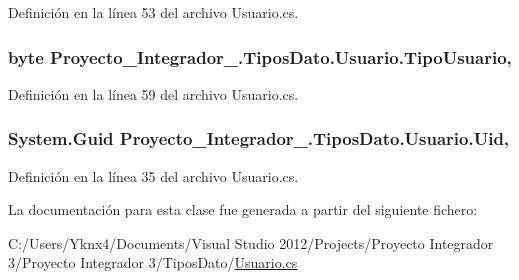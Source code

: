 Definición en la línea 53 del archivo Usuario.\-cs.

\hypertarget{class_proyecto___integrador__3_1_1_tipos_dato_1_1_usuario_a56f1e08f344ba5851703edab28232278}{
\subsubsection[{Tipo\-Usuario}]{\setlength{\rightskip}{0pt plus 5cm}byte Proyecto\-\_\-\-Integrador\-\_.\-Tipos\-Dato.\-Usuario.\-Tipo\-Usuario\hspace{0.3cm}{\ttfamily [get]}, {\ttfamily [set]}}}\label{class_proyecto___integrador__3_1_1_tipos_dato_1_1_usuario_a56f1e08f344ba5851703edab28232278}


Definición en la línea 59 del archivo Usuario.\-cs.

\hypertarget{class_proyecto___integrador__3_1_1_tipos_dato_1_1_usuario_ae9cfa8c8b462028b8c166f7a1eff5f1f}{
\subsubsection[{Uid}]{\setlength{\rightskip}{0pt plus 5cm}System.\-Guid Proyecto\-\_\-\-Integrador\-\_.\-Tipos\-Dato.\-Usuario.\-Uid\hspace{0.3cm}{\ttfamily [get]}, {\ttfamily [set]}}}\label{class_proyecto___integrador__3_1_1_tipos_dato_1_1_usuario_ae9cfa8c8b462028b8c166f7a1eff5f1f}


Definición en la línea 35 del archivo Usuario.\-cs.



La documentación para esta clase fue generada a partir del siguiente fichero\-:\begin{DoxyCompactItemize}
\item 
C\-:/\-Users/\-Yknx4/\-Documents/\-Visual Studio 2012/\-Projects/\-Proyecto Integrador 3/\-Proyecto Integrador 3/\-Tipos\-Dato/\hyperlink{_usuario_8cs}{Usuario.\-cs}\end{DoxyCompactItemize}
